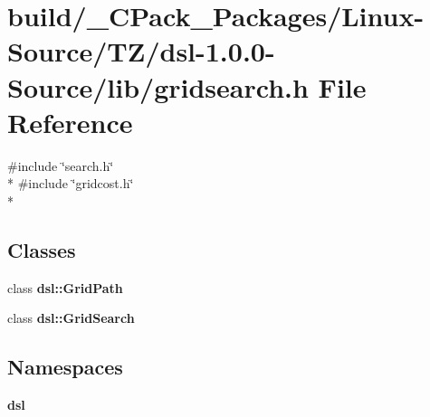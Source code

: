 \section{build/\-\_\-\-C\-Pack\-\_\-\-Packages/\-Linux-\/\-Source/\-T\-Z/dsl-\/1.0.0-\/\-Source/lib/gridsearch.h File Reference}
\label{build_2__CPack__Packages_2Linux-Source_2TZ_2dsl-1_80_80-Source_2lib_2gridsearch_8h}
{\ttfamily \#include \char`\"{}search.\-h\char`\"{}}\\*
{\ttfamily \#include \char`\"{}gridcost.\-h\char`\"{}}\\*
\subsection*{Classes}
\begin{DoxyCompactItemize}
\item 
class {\bf dsl\-::\-Grid\-Path}
\item 
class {\bf dsl\-::\-Grid\-Search}
\end{DoxyCompactItemize}
\subsection*{Namespaces}
\begin{DoxyCompactItemize}
\item 
{\bf dsl}
\end{DoxyCompactItemize}
